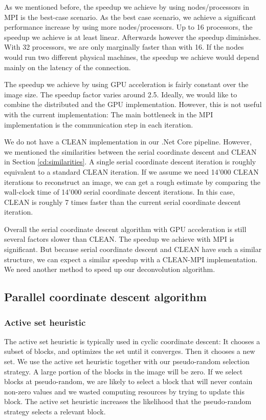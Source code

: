 As we mentioned before, the speedup we achieve by using nodes/processors in MPI is the best-case scenario. As the best case scenario, we achieve a significant performance increase by using more nodes/processors. Up to 16 processors, the speedup we achieve is at least linear. Afterwards however the speedup diminishes. With 32 processors, we are only marginally faster than with 16. If the nodes would run two different physical machines, the speedup we achieve would depend mainly on the latency of the connection. 

The speedup we achieve by using GPU acceleration is fairly constant over the image size. The speedup factor varies around 2.5. Ideally, we would like to combine the distributed and the GPU implementation. However, this is not useful with the current implementation: The main bottleneck in the MPI implementation is the communication step in each iteration. 

We do not have a CLEAN implementation in our .Net Core pipeline. However, we mentioned the similarities between the serial coordinate descent and CLEAN in Section \ref{cd:similarities}. A single serial coordinate descent iteration is roughly equivalent to a standard CLEAN iteration. If we assume we need 14'000 CLEAN iterations to reconstruct an image, we can get a rough estimate by comparing the wall-clock time of 14'000 serial coordinate descent iterations. In this case, CLEAN is roughly 7 times faster than the current serial coordinate descent iteration.

Overall the serial coordinate descent algorithm with GPU acceleration is still several factors slower than CLEAN. The speedup we achieve with MPI is significant. But because serial coordinate descent and CLEAN have such a similar structure, we can expect a similar speedup with a CLEAN-MPI implementation. We need another method to speed up our deconvolution algorithm.


\subsection{Parallel coordinate descent algorithm}

\subsubsection{Active set heuristic}
The active set heuristic is typically used in cyclic coordinate descent: It chooses a subset of blocks, and optimizes the set until it converges. Then it chooses a  new set. We use the active set heuristic together with our pseudo-random selection strategy. A large portion of the blocks in the image will be zero. If we select blocks at pseudo-random, we are likely to select a block that will never contain non-zero values and we wasted computing resources by trying to update this block. The active set heuristic increases the likelihood that the pseudo-random strategy selects a relevant block. 

